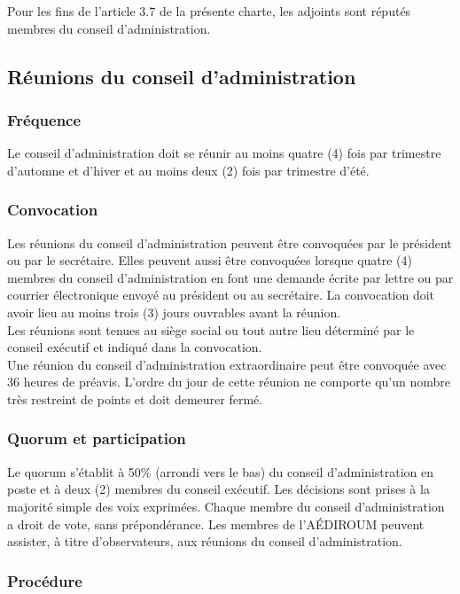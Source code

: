 \documentclass[12pt]{article}
\begin{document}
Pour les fins de l’article 3.7 de la présente charte, les adjoints sont réputés membres du conseil d’administration.

\subsection{Réunions du conseil d'administration}
\subsubsection{Fréquence}

Le conseil d'administration doit se réunir au moins quatre (4) fois par trimestre d'automne et d'hiver et au moins deux (2) fois par trimestre d'été.

\subsubsection{Convocation}

Les réunions du conseil d'administration peuvent être convoquées par le président ou par le secrétaire. Elles peuvent aussi être convoquées lorsque quatre (4) membres du conseil d'administration en font une demande écrite par lettre ou par courrier électronique envoyé au président ou au secrétaire. La convocation doit avoir lieu au moins trois (3) jours ouvrables avant la réunion.\\
Les réunions sont tenues au siège social ou tout autre lieu déterminé par le conseil exécutif et indiqué dans la convocation.\\
Une réunion du conseil d'administration extraordinaire peut être convoquée avec 36 heures de préavis. L'ordre du jour de cette réunion ne comporte qu'un nombre très restreint de points et doit demeurer fermé.

\subsubsection{Quorum et participation}

Le quorum s'établit à 50\% (arrondi vers le bas) du conseil d'administration en poste et à deux (2) membres du conseil exécutif. Les décisions sont prises à la majorité simple des voix exprimées. Chaque membre du conseil d'administration a droit de vote, sans prépondérance. Les membres de l'AÉDIROUM peuvent assister, à titre d'observateurs, aux réunions du conseil d'administration.

\subsubsection{Procédure}
\end{document}
